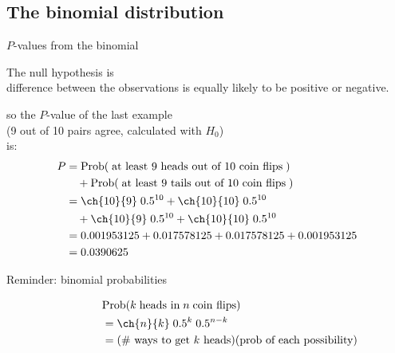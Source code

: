 \subsection{The binomial distribution}

\begin{frame}{$P$-values from the binomial}

  The null hypothesis is \\
  \hspace{2em}  difference between the observations is equally likely to be positive or negative.

    \vspace{2em}

    so the $P$-value of the last example \\
    (9 out of 10 pairs agree, calculated with $H_0$) \\
    is:
    \begin{align*} 
      P &= \mbox{Prob}( \; \text{at least 9 heads out of 10 coin flips}\; ) \\
       &\quad + \mbox{Prob}( \; \text{at least 9 tails out of 10 coin flips}\; ) \\
       &= \ch{10}{9} \; 0.5^{10} + \ch{10}{10} \; 0.5^{10} \\
       &\quad + \ch{10}{9} \; 0.5^{10} + \ch{10}{10}\;  0.5^{10} \\
       &= 0.001953125 + 0.017578125 + 0.017578125 + 0.001953125  \\
       &= 0.0390625
     \end{align*}

\end{frame}

\begin{frame}{Reminder: binomial probabilities}

  \begin{align*}
    &\mbox{Prob}( k \; \text{heads in} \; n \; \text{coin flips} ) \\
    \qquad \qquad &= \ch{n}{k} \; 0.5^k \; 0.5^{n-k} \\
    \qquad \qquad &= \text{(\# ways to get $k$ heads)} \text{(prob of each possibility)}
  \end{align*}

    \vspace{2em}



\end{frame}

